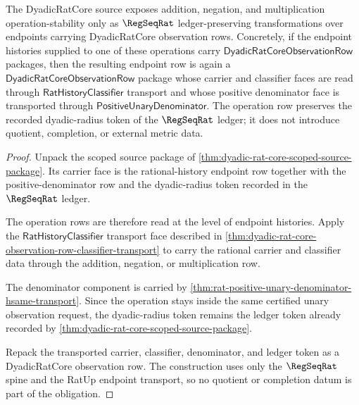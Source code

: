 \begin{theorem}
\label{thm:dyadic-rat-core-operation-stability-obligation}
The DyadicRatCore source exposes addition, negation, and multiplication
operation-stability only as $\RegSeqRat$ ledger-preserving transformations over
endpoints carrying DyadicRatCore observation rows. Concretely, if the endpoint
histories supplied to one of these operations carry
$\mathsf{DyadicRatCoreObservationRow}$ packages, then the resulting endpoint
row is again a $\mathsf{DyadicRatCoreObservationRow}$ package whose carrier and
classifier faces are read through $\mathsf{RatHistoryClassifier}$ transport and
whose positive denominator face is transported through
$\mathsf{PositiveUnaryDenominator}$. The operation row preserves the recorded
dyadic-radius token of the $\RegSeqRat$ ledger; it does not introduce quotient,
completion, or external metric data.
\end{theorem}
\begin{proof}
Unpack the scoped source package of
\autoref{thm:dyadic-rat-core-scoped-source-package}. Its carrier face is the
rational-history endpoint row together with the positive-denominator row and
the dyadic-radius token recorded in the $\RegSeqRat$ ledger.

The operation rows are therefore read at the level of endpoint histories.
Apply the $\mathsf{RatHistoryClassifier}$ transport face described in
\autoref{thm:dyadic-rat-core-observation-row-classifier-transport} to carry the
rational carrier and classifier data through the addition, negation, or
multiplication row.

The denominator component is carried by
\autoref{thm:rat-positive-unary-denominator-hsame-transport}. Since the
operation stays inside the same certified unary observation request, the
dyadic-radius token remains the ledger token already recorded by
\autoref{thm:dyadic-rat-core-scoped-source-package}.

Repack the transported carrier, classifier, denominator, and ledger token as a
DyadicRatCore observation row. The construction uses only the $\RegSeqRat$
spine and the RatUp endpoint transport, so no quotient or completion datum is
part of the obligation.
\end{proof}

